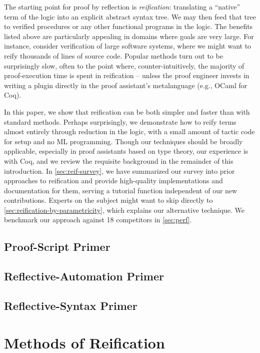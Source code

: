 The starting point for proof by reflection is \emph{reification}: translating a ``native'' term of the logic into an explicit abstract syntax tree.
We may then feed that tree to verified procedures or any other functional programs in the logic.
The benefits listed above are particularly appealing in domains where goals are very large.
For instance, consider verification of large software systems, where we might want to reify thousands of lines of source code.
Popular methods turn out to be surprisingly slow, often to the point where, counter-intuitively, the majority of proof-execution time is spent in reification -- unless the proof engineer invests in writing a plugin directly in the proof assistant's metalanguage (e.g., OCaml for Coq).

In this paper, we show that reification can be both simpler and faster than with standard methods.
Perhaps surprisingly, we demonstrate how to reify terms almost entirely through reduction in the logic, with a small amount of tactic code for setup and no ML programming.
Though our techniques should be broadly applicable, especially in proof assistants based on type theory, our experience is with Coq, and we review the requisite background in the remainder of this introduction.
In \autoref{sec:reif-survey}, we have summarized our survey into prior approaches to reification and provide high-quality implementations and documentation for them, serving a tutorial function independent of our new contributions.
Experts on the subject might want to skip directly to \autoref{sec:reification-by-parametricity}, which explains our alternative technique.
We benchmark our approach against 18 competitors in \autoref{sec:perf}.

\subsection{Proof-Script Primer}

\subsection{Reflective-Automation Primer}

\subsection{Reflective-Syntax Primer}

\section{Methods of Reification}

